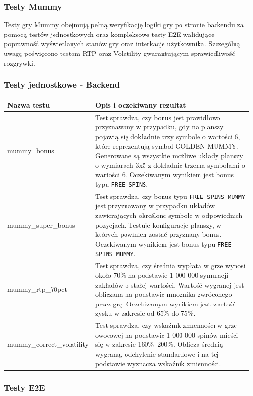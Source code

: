 \documentclass[a4paper,12pt]{article}
\begin{document}
\subsubsection{Testy Mummy}
Testy gry Mummy obejmują pełną weryfikację logiki gry po stronie backendu za pomocą testów jednostkowych oraz kompleksowe testy E2E walidujące poprawność wyświetlanych stanów gry oraz interkacje użytkownika. Szczególną uwagę poświęcono testom RTP oraz Volatility gwarantującym sprawiedliwość rozgrywki.

\subsubsection*{Testy jednostkowe - Backend}

\begin{tabularx}{\textwidth}{lX}
\toprule
\textbf{Nazwa testu} & \textbf{Opis i oczekiwany rezultat} \\
\midrule
mummy\_bonus & Test sprawdza, czy bonus jest prawidłowo przyznawany w przypadku, gdy na planszy pojawią się dokładnie trzy symbole o wartości 6, które reprezentują symbol GOLDEN MUMMY. Generowane są wszystkie możliwe układy planszy o wymiarach 3x5 z dokładnie trzema symbolami o wartości 6. Oczekiwanym wynikiem jest bonus typu \texttt{FREE SPINS}. \\
\midrule
mummy\_super\_bonus & Test sprawdza, czy bonus typu \texttt{FREE SPINS MUMMY} jest przyznawany w przypadku układów zawierających określone symbole w odpowiednich pozycjach. Testuje konfiguracje planszy, w których powinien zostać przyznany bonus. Oczekiwanym wynikiem jest bonus typu \texttt{FREE SPINS MUMMY}. \\
\midrule
mummy\_rtp\_70pct & Test sprawdza, czy średnia wypłata w grze wynosi około 70\% na podstawie 1 000 000 symulacji zakładów o stałej wartości. Wartość wygranej jest obliczana na podstawie mnożnika zwróconego przez grę. Oczekiwanym wynikiem jest wartość zysku w zakresie od 65\% do 75\%. \\
\midrule
mummy\_correct\_volatility & Test sprawdza, czy wskaźnik zmienności w grze owocowej na podstawie 1 000 000 spinów mieści się w zakresie 160\%–200\%. Oblicza średnią wygraną, odchylenie standardowe i na tej podstawie wyznacza wskaźnik zmienności. \\
\bottomrule
\end{tabularx}

\subsubsection*{Testy E2E}
\end{document}
